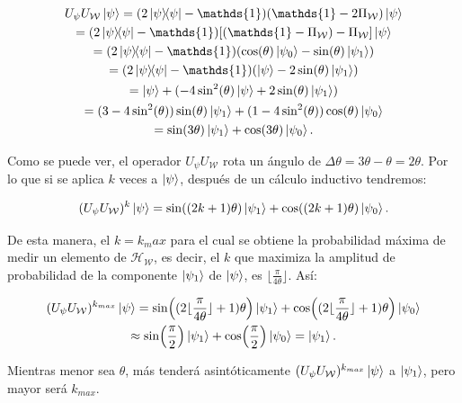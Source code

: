 \begin{multline}
    U_\psi U_\mathcal{W} \ket{\psi} = (2 \ketbra{\psi}{\psi} - \mathds{1}) (\mathds{1} - 2 \Pi_\mathcal{W}) \ket{\psi} \\
    = (2 \ketbra{\psi}{\psi} - \mathds{1}) [(\mathds{1} - \Pi_\mathcal{W}) - \Pi_\mathcal{W}] \ket{\psi} \\
    = (2 \ketbra{\psi}{\psi} - \mathds{1}) (\cos(\theta) \ket{\psi_0} - \sin(\theta) \ket{\psi_1}) \\
    = (2 \ketbra{\psi}{\psi} - \mathds{1}) (\ket{\psi} - 2 \sin(\theta) \ket{\psi_1}) \\
    = \ket{\psi} + (- 4 \sin^2(\theta) \ket{\psi} + 2 \sin(\theta) \ket{\psi_1}) \\
    = (3 - 4 \sin^2(\theta)) \sin(\theta) \ket{\psi_1} + (1 - 4 \sin^2(\theta)) \cos(\theta) \ket{\psi_0} \\
    = \sin(3 \theta) \ket{\psi_1} + \cos(3 \theta) \ket{\psi_0} .
    \label{eq:DTheta}
\end{multline}

Como se puede ver, el operador $U_\psi U_\mathcal{W}$ rota un ángulo de $\Delta\theta = 3\theta - \theta = 2 \theta$. Por lo que si se aplica $k$ veces a $\ket{\psi}$, después de un cálculo inductivo tendremos:

\begin{equation}
    (U_\psi U_\mathcal{W})^k \ket{\psi} = \sin( (2 k + 1) \theta) \ket{\psi_1} + \cos( (2 k + 1) \theta) \ket{\psi_0} .
\end{equation}

De esta manera, el $k = k_max$ para el cual se obtiene la probabilidad máxima de medir un elemento de $\mathcal{H}_\mathcal{W}$, es decir, el $k$ que maximiza la amplitud de probabilidad de la componente $\ket{\psi_1}$ de $\ket{\psi}$, es $\lfloor \frac{\pi}{4 \theta} \rfloor$. Así:

\begin{multline}
    (U_\psi U_\mathcal{W})^{k_{max}} \ket{\psi} = \sin( (2 \lfloor \frac{\pi}{4 \theta} \rfloor + 1) \theta) \ket{\psi_1} + \cos( (2 \lfloor \frac{\pi}{4 \theta} \rfloor + 1) \theta) \ket{\psi_0} \\
    \approx \sin(\frac{\pi}{2}) \ket{\psi_1} + \cos(\frac{\pi}{2}) \ket{\psi_0} = \ket{\psi_1} .
\end{multline}

Mientras menor sea $\theta$, más tenderá asintóticamente $(U_\psi U_\mathcal{W})^{k_{max}} \ket{\psi}$ a $\ket{\psi_1}$, pero mayor será $k_{max}$.

